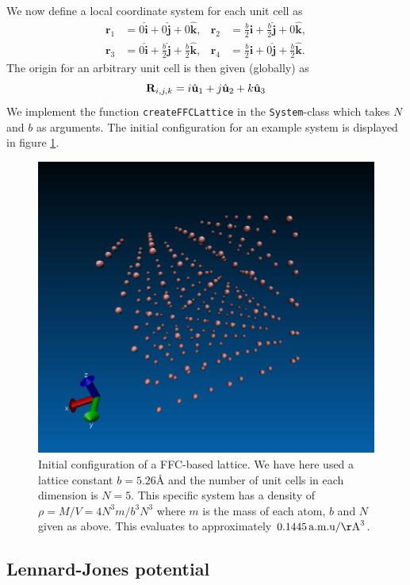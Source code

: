 \documentclass[a4paper]{article}
\renewcommand{\vec}[1]{\mathbf{#1}}
\begin{document}
    We now define a local coordinate system for each unit cell as
    \begin{align*}
        \vec{r}_1 &= 0\hat{\vec{i}} + 0\hat{\vec{j}} + 0\hat{\vec{k}}, &
        \vec{r}_2 &= \frac{b}{2}\hat{\vec{i}} + \frac{b}{2}\hat{\vec{j}} +
        0\hat{\vec{k}},\\ \vec{r}_3 &= 0\hat{\vec{i}} +
        \frac{b}{2}\hat{\vec{j}} + \frac{b}{2}\hat{\vec{k}}, & \vec{r}_4 &=
        \frac{b}{2}\hat{\vec{i}} + 0\hat{\vec{j}} + \frac{b}{2}\hat{\vec{k}}.
    \end{align*}
    The origin for an arbitrary unit cell is then given (globally) as
    \begin{equation}
        \notag \vec{R}_{i, j, k} = i\hat{\vec{u}}_1 + j\hat{\vec{u}}_2 +
        k\hat{\vec{u}}_3
    \end{equation}
    We implement the function \texttt{createFFCLattice} in the
    \texttt{System}-class which takes $N$ and $b$ as arguments. The initial
    configuration for an example system is displayed in figure
    \ref{fig:ffc_iteration}.
    \begin{figure}
        \centering \includegraphics[width=0.4\linewidth]{ffc_iteration}
        \caption[Crystallic structure in argon]{Initial configuration of a
            FFC-based lattice. We have here used a lattice constant $b =
            5.26${\AA} and the number of unit cells in each dimension is $N =
            5$. This specific system has a density of $\rho = M / V = 4N^3m /
            b^3N^3$ where $m$ is the mass of each atom, $b$ and $N$ given as
            above. This evaluates to approximately $0.1445 \,\mathrm{a.m.u} /
        \mathrm{\AA}^3$.}
        \label{fig:ffc_iteration}
    \end{figure}
    
\subsection{Lennard-Jones potential}
\label{sub:lennard_jones_potential}
\end{document}
